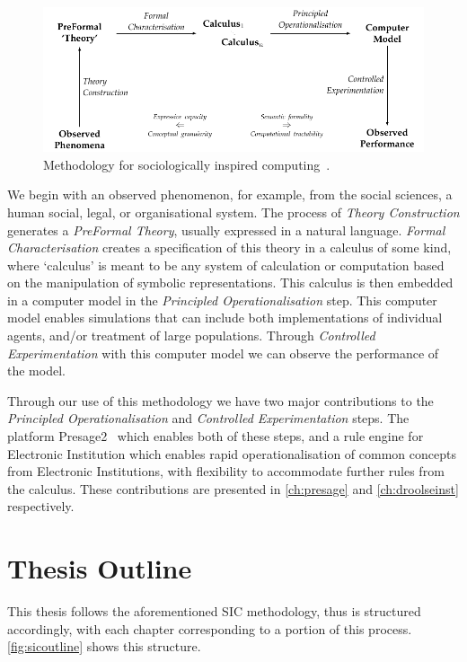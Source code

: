 \begin{figure}
\includegraphics[width=\linewidth]{gfx/intro/sic}
\caption[Methodology for sociologically inspired computing.]{Methodology for sociologically inspired computing~\citep{Jones2013}.}\label{fig:sic}
\end{figure}

We begin with an observed phenomenon, for example, from the social sciences, a human social, legal, or organisational system. The process of \emph{Theory Construction} generates a \emph{PreFormal Theory}, usually expressed in a natural language. \emph{Formal Characterisation} creates a specification of this theory in a calculus of some kind, where `calculus' is meant to be any system of calculation or computation based on the manipulation of symbolic representations. This calculus is then embedded in a computer model in the \emph{Principled Operationalisation} step. This computer model enables simulations that can include both implementations of individual agents, and/or treatment of large populations. Through \emph{Controlled Experimentation} with this computer model we can observe the performance of the model.

Through our use of this methodology we have two major contributions to the \emph{Principled Operationalisation} and \emph{Controlled Experimentation} steps. The platform Presage2~\citep{Macbeth2014} which enables both of these steps, and a rule engine for Electronic Institution which enables rapid operationalisation of common concepts from Electronic Institutions, with flexibility to accommodate further rules from the calculus. These contributions are presented in \autoref{ch:presage} and \autoref{ch:droolseinst} respectively.

\section{Thesis Outline}

This thesis follows the aforementioned \ac{SIC} methodology, thus is structured accordingly, with each chapter corresponding to a portion of this process. \autoref{fig:sicoutline} shows this structure. 

